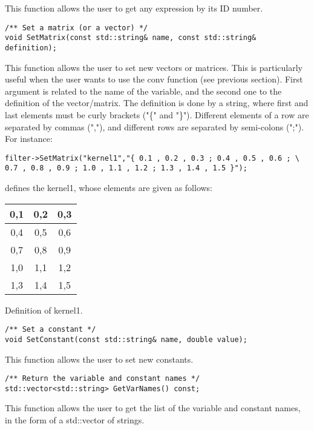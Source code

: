 This function allows the user to get any expression by its ID number.

\begin{verbatim}
/** Set a matrix (or a vector) */
void SetMatrix(const std::string& name, const std::string& definition);
\end{verbatim}

This function allows the user to set new vectors or matrices. This is particularly useful when the user wants to use the conv function (see previous section). First argument is related to the name of the variable, and the second one to the definition of the vector/matrix. The definition is done by a string, where first and last elements must be curly brackets ("\{" and "\}"). Different elements of a row are separated by commas (","), and different rows are separated by semi-colons (";"). For instance:

\begin{verbatim}
filter->SetMatrix("kernel1","{ 0.1 , 0.2 , 0.3 ; 0.4 , 0.5 , 0.6 ; \
0.7 , 0.8 , 0.9 ; 1.0 , 1.1 , 1.2 ; 1.3 , 1.4 , 1.5 }");
\end{verbatim}

defines the kernel1, whose elements are given as follows:

\begin{center} 
\begin{tabular}{|c|c|c|}
\hline
0,1	& 0,2	& 0,3 \\
\hline
0,4 &	0,5	& 0,6 \\
\hline
0,7 &	0,8	& 0,9 \\
\hline
1,0	& 1,1	& 1,2 \\
\hline
1,3	& 1,4	& 1,5 \\
\hline
\end{tabular}
\end{center}
\caption{Definition of kernel1.}
\label{correctness}

\begin{verbatim}
/** Set a constant */
void SetConstant(const std::string& name, double value);
\end{verbatim}

This function allows the user to set new constants.


\begin{verbatim}
/** Return the variable and constant names */
std::vector<std::string> GetVarNames() const;
\end{verbatim}

This function allows the user to get the list of the variable and constant names, in the form of a std::vector of strings.

